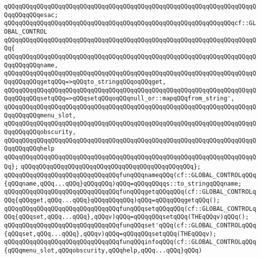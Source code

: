 \verb|qQQqqQQqqQQqqQQqqQQqqQQqqQQqqQQqqQQqqQQqqQQqqQQqqQQqqQQqqQQqqQQqqQQqqQQqqQQqqQQqesac;|\newline
\newline
\verb|qQQqqQQqqQQqqQQqqQQqqQQqqQQqqQQqqQQqqQQqqQQqqQQqqQQqqQQqqQQqqQQqcf::GLOBAL_CONTROL|\newline
\verb|qQQqqQQqqQQqqQQqqQQqqQQqqQQqqQQqqQQqqQQqqQQqqQQqqQQqqQQqqQQqqQQqqQQqqQQq{|\newline
\verb|qQQqqQQqqQQqqQQqqQQqqQQqqQQqqQQqqQQqqQQqqQQqqQQqqQQqqQQqqQQqqQQqqQQqqQQqqQQqqQQqname,|\newline
\verb|qQQqqQQqqQQqqQQqqQQqqQQqqQQqqQQqqQQqqQQqqQQqqQQqqQQqqQQqqQQqqQQqqQQqqQQqqQQqqQQqgetqQQq=>qQQqto_stringqQQqoqQQqget,|\newline
\verb|qQQqqQQqqQQqqQQqqQQqqQQqqQQqqQQqqQQqqQQqqQQqqQQqqQQqqQQqqQQqqQQqqQQqqQQqqQQqqQQqsetqQQq=>qQQqsetqQQqoqQQqnull_or::mapqQQqfrom_string',|\newline
\verb|qQQqqQQqqQQqqQQqqQQqqQQqqQQqqQQqqQQqqQQqqQQqqQQqqQQqqQQqqQQqqQQqqQQqqQQqqQQqqQQqmenu_slot,|\newline
\verb|qQQqqQQqqQQqqQQqqQQqqQQqqQQqqQQqqQQqqQQqqQQqqQQqqQQqqQQqqQQqqQQqqQQqqQQqqQQqqQQqobscurity,|\newline
\verb|qQQqqQQqqQQqqQQqqQQqqQQqqQQqqQQqqQQqqQQqqQQqqQQqqQQqqQQqqQQqqQQqqQQqqQQqqQQqqQQqhelp|\newline
\verb|qQQqqQQqqQQqqQQqqQQqqQQqqQQqqQQqqQQqqQQqqQQqqQQqqQQqqQQqqQQqqQQqqQQqqQQq};|\newline
\verb|qQQqqQQqqQQqqQQqqQQqqQQqqQQqqQQqqQQqqQQqqQQqqQQq};|\newline
\newline
\verb|qQQqqQQqqQQqqQQqqQQqqQQqqQQqqQQqfunqQQqnameqQQq(cf::GLOBAL_CONTROLqQQq{qQQqname,qQQq...qQQq}qQQqqQQq)qQQq=qQQqqQQqqs::to_stringqQQqname;|\newline
\verb|qQQqqQQqqQQqqQQqqQQqqQQqqQQqqQQqfunqQQqgetqQQqqQQq(cf::GLOBAL_CONTROLqQQq{qQQqget,qQQq...qQQq}qQQqqQQqqQQq)qQQq=qQQqqQQqgetqQQq();|\newline
\verb|qQQqqQQqqQQqqQQqqQQqqQQqqQQqqQQqfunqQQqsetqQQqqQQq(cf::GLOBAL_CONTROLqQQq{qQQqset,qQQq...qQQq},qQQqv)qQQq=qQQqqQQqsetqQQq(THEqQQqv)qQQq();|\newline
\verb|qQQqqQQqqQQqqQQqqQQqqQQqqQQqqQQqfunqQQqset'qQQq(cf::GLOBAL_CONTROLqQQq{qQQqset,qQQq...qQQq},qQQqv)qQQq=qQQqqQQqsetqQQq(THEqQQqv);|\newline
\newline
\verb|qQQqqQQqqQQqqQQqqQQqqQQqqQQqqQQqfunqQQqinfoqQQq(cf::GLOBAL_CONTROLqQQq{qQQqmenu_slot,qQQqobscurity,qQQqhelp,qQQq...qQQq}qQQq)|\newline
